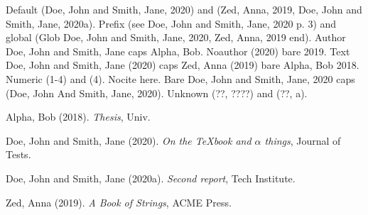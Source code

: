 Default (Doe, John and Smith, Jane, 2020) and (Zed, Anna, 2019,  Doe, John and Smith, Jane, 2020a).
Prefix (see Doe, John and Smith, Jane, 2020 p. 3) and global (Glob Doe, John and Smith, Jane, 2020,  Zed, Anna, 2019  end).
Author Doe, John and Smith, Jane caps Alpha, Bob.
Noauthor (2020) bare 2019.
Text Doe, John and Smith, Jane (2020) caps Zed, Anna (2019) bare Alpha, Bob 2018.
Numeric (1-4) and (4).
Nocite here.
Bare Doe, John and Smith, Jane, 2020 caps (Doe, John And Smith, Jane, 2020).
Unknown (??, ????) and (??, a).

\noindent
Alpha, Bob (2018). \emph{Thesis}, Univ.

\noindent
Doe, John and Smith, Jane (2020). \emph{On the {TeX}book and $\alpha$ \alpha{} things}, Journal of Tests.

\noindent
Doe, John and Smith, Jane (2020a). \emph{Second report}, Tech Institute.

\noindent
Zed, Anna (2019). \emph{A Book of Strings}, ACME Press.

